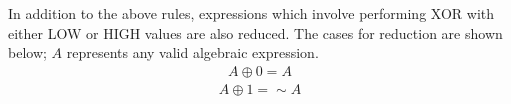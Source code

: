 In addition to the above rules, expressions which involve performing XOR with either LOW or HIGH values are also reduced. The cases for reduction are shown below; $A$ represents any valid algebraic expression.
\begin{align*}
    A \oplus 0 = A
\end{align*}
\begin{align*}
    A \oplus 1 = \sim A
\end{align*}

    
    
    
    
    
    
    
    
    
    
    
    
    
    
    


